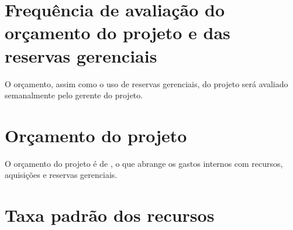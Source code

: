 \section{Frequência de avaliação do orçamento do projeto e das reservas gerenciais}

O orçamento, assim como o uso de reservas gerenciais, do projeto será avaliado semanalmente pelo gerente do projeto.

\section{Orçamento do projeto}


O orçamento do projeto é de \maximumBudget{}, o que abrange os gastos internos com recursos, aquisições e reservas gerenciais.

\section{Taxa padrão dos recursos}

